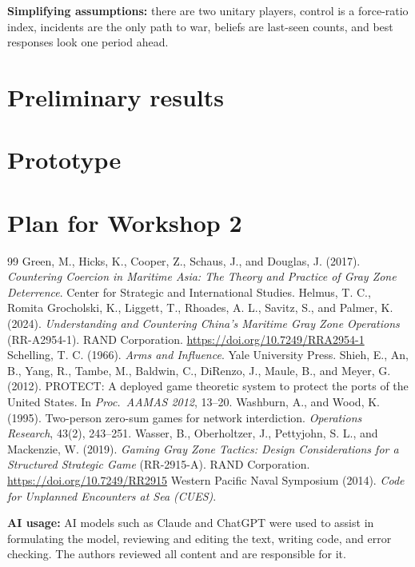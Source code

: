 \documentclass[10pt]{article}
\newcommand{\1}{\mathbf{1}}
\begin{document}
\textbf{Simplifying assumptions:} there are two unitary players, control is a force-ratio index, incidents are the
only path to war, beliefs are last-seen counts, and best responses look one period ahead.

\section{Preliminary results}


\section{Prototype}


\section{Plan for Workshop 2}


\begin{thebibliography}{99}\small\setlength{\itemsep}{0pt}
 Green, M., Hicks, K., Cooper, Z., Schaus, J., and Douglas, J. (2017).
\emph{Countering Coercion in Maritime Asia: The Theory and Practice of Gray Zone Deterrence}. Center for Strategic and International Studies.
 Helmus, T. C., Romita Grocholski, K., Liggett, T., Rhoades, A. L., Savitz, S., and Palmer, K. (2024).
\emph{Understanding and Countering China's Maritime Gray Zone Operations} (RR-A2954-1). RAND Corporation. \url{https://doi.org/10.7249/RRA2954-1}
 Schelling, T. C. (1966). \emph{Arms and Influence}. Yale University Press.
 Shieh, E., An, B., Yang, R., Tambe, M., Baldwin, C., DiRenzo, J., Maule, B., and Meyer, G. (2012).
PROTECT: A deployed game theoretic system to protect the ports of the United States. In \emph{Proc.\ AAMAS 2012}, 13--20.
 Washburn, A., and Wood, K. (1995). Two-person zero-sum games for network interdiction. \emph{Operations Research}, 43(2), 243--251.
 Wasser, B., Oberholtzer, J., Pettyjohn, S. L., and Mackenzie, W. (2019).
\emph{Gaming Gray Zone Tactics: Design Considerations for a Structured Strategic Game} (RR-2915-A). RAND Corporation. \url{https://doi.org/10.7249/RR2915}
 Western Pacific Naval Symposium (2014). \emph{Code for Unplanned Encounters at Sea (CUES)}.
\end{thebibliography}
\noindent\small\textbf{AI usage:} AI models such as Claude and ChatGPT were used to assist in formulating the model, reviewing and
editing the text, writing code, and error checking. The authors reviewed all content and are responsible for it.
\end{document}
